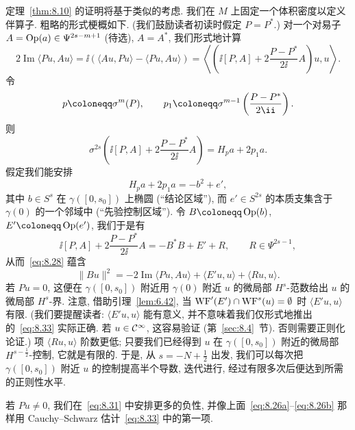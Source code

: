 定理~\ref{thm:8.10} 的证明将基于类似的考虑. 我们在 $M$ 上固定一个体积密度以定义伴算子. 粗略的形式梗概如下. (我们鼓励读者初读时假定 $P = P^*$.) 对一个对易子 $A = \operatorname{Op}(a) \in \Psi^{2s-m+1}$ (待选), $A = A^*$, 我们形式地计算
\begin{equation}\label{eq:8.28}
    2 \operatorname{Im} \langle Pu, Au \rangle = \ii\left( \langle Au, Pu \rangle - \langle Pu, Au \rangle \right) = \left\langle \left( \ii[P, A] + 2\frac{P - P^*}{2\ii}A \right)u, u \right\rangle.
\end{equation}
令
\begin{equation}\label{eq:8.29}
    p \defeq \sigma^m(P), \qquad p_1 \defeq \sigma^{m-1}\left( \frac{P - P^*}{2\ii} \right).
\end{equation}
则
\begin{equation}\label{eq:8.30}
    \sigma^{2s}\left( \ii[P, A] + 2\frac{P - P^*}{2\ii}A \right) = H_p a + 2 p_1 a.
\end{equation}
假定我们能安排
\begin{equation}\label{eq:8.31}
    H_p a + 2 p_1 a = -b^2 + e',
\end{equation}
其中 $b \in S^s$ 在 $\gamma([0, s_0])$ 上椭圆 (``结论区域''), 而 $e' \in S^{2s}$ 的本质支集含于 $\gamma(0)$ 的一个邻域中 (``先验控制区域''). 令 $B \defeq \Op(b)$, $E' \defeq \Op(e')$, 我们于是有
\begin{equation}\label{eq:8.32}
    \ii[P, A] + 2\frac{P - P^*}{2\ii}A = -B^*B + E' + R, \qquad R \in \Psi^{2s-1},
\end{equation}
从而~\eqref{eq:8.28} 蕴含
\begin{equation}\label{eq:8.33}
    \| B u \|^2 = -2 \operatorname{Im} \langle P u, A u \rangle + \langle E' u, u \rangle + \langle R u, u \rangle.
\end{equation}
若 $Pu = 0$, 这便在 $\gamma([0, s_0])$ 附近用 $\gamma(0)$ 附近 $u$ 的微局部 $H^s$-范数给出 $u$ 的微局部 $H^s$-界. 注意, 借助引理~\ref{lem:6.42}, 当 $\operatorname{WF}'(E') \cap \operatorname{WF}^s(u) = \emptyset$ 时 $\langle E'u, u \rangle$ 有限. (我们要提醒读者: $\langle E'u,u \rangle$ 能有意义, 并不意味着我们仅形式地推出的~\eqref{eq:8.33} 实际正确. 若 $u \in \mathcal{C}^\infty$, 这容易验证 (第~\ref{sec:8.4}~节). 否则需要正则化论证.) 项 $\langle Ru, u \rangle$ 阶数更低; 只要我们已经得到 $u$ 在 $\gamma([0, s_0])$ 附近的微局部 $H^{s-\frac{1}{2}}$-控制, 它就是有限的. 于是, 从 $s = -N + \frac{1}{2}$ 出发, 我们可以每次把 $\gamma([0, s_0])$ 附近 $u$ 的控制提高半个导数, 迭代进行, 经过有限多次后便达到所需的正则性水平.

若 $Pu \neq 0$, 我们在~\eqref{eq:8.31} 中安排更多的负性, 并像上面~\eqref{eq:8.26a}--\eqref{eq:8.26b} 那样用 Cauchy--Schwarz 估计~\eqref{eq:8.33} 中的第一项.


